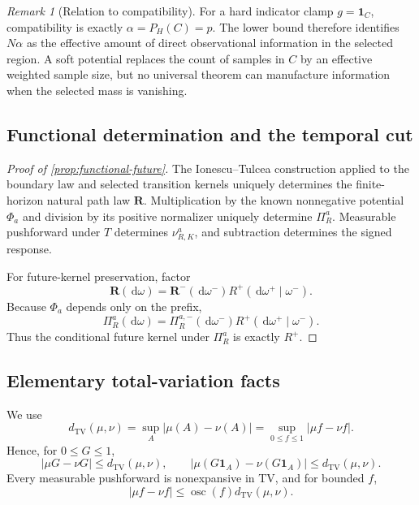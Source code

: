 \documentclass{article}
\newcommand{\TV}{d_{\mathrm{TV}}}
\newcommand{\osc}{\operatorname{osc}}
\newcommand{\PathR}{\mathbf R}
\newcommand{\dd}{\,\mathrm d}
\theoremstyle{remark}
\newtheorem{remark}[definition]{Remark}
\begin{document}
\begin{remark}[Relation to compatibility]
For a hard indicator clamp \(g=\mathbf 1_C\), compatibility is exactly
\(\alpha=P_H(C)=p\). The lower bound therefore identifies \(N\alpha\) as the
effective amount of direct observational information in the selected region.
A soft potential replaces the count of samples in \(C\) by an effective
weighted sample size, but no universal theorem can manufacture information
when the selected mass is vanishing.
\end{remark}

\subsection{Functional determination and the temporal cut}

\begin{proof}[Proof of \cref{prop:functional-future}]
The Ionescu--Tulcea construction applied to the boundary law and selected
transition kernels uniquely determines the finite-horizon natural path law
\(\PathR\). Multiplication by the known nonnegative potential \(\Phi_a\) and
division by its positive normalizer uniquely determine \(\Pi_R^a\). Measurable
pushforward under \(T\) determines \(\nu_{R,K}^a\), and subtraction determines
the signed response.

For future-kernel preservation, factor
\[
  \PathR(\dd\omega)
  =
  \PathR^-(\dd\omega^-)
  R^+(\dd\omega^+\mid\omega^-).
\]
Because \(\Phi_a\) depends only on the prefix,
\[
  \Pi_R^a(\dd\omega)
  =
  \Pi_R^{a,-}(\dd\omega^-)
  R^+(\dd\omega^+\mid\omega^-).
\]
Thus the conditional future kernel under \(\Pi_R^a\) is exactly \(R^+\).
\end{proof}

\subsection{Elementary total-variation facts}

We use
\[
  \TV(\mu,\nu)
  =
  \sup_A|\mu(A)-\nu(A)|
  =
  \sup_{0\leq f\leq1}|\mu f-\nu f|.
\]
Hence, for \(0\leq G\leq1\),
\begin{equation}
  |\mu G-\nu G|\leq\TV(\mu,\nu),
  \qquad
  |\mu(G\mathbf 1_A)-\nu(G\mathbf 1_A)|
  \leq\TV(\mu,\nu).
  \label{eq:tv-weight-facts-app}
\end{equation}
Every measurable pushforward is nonexpansive in TV, and for bounded \(f\),
\[
  |\mu f-\nu f|
  \leq
  \osc(f)\TV(\mu,\nu).
\]
\end{document}
